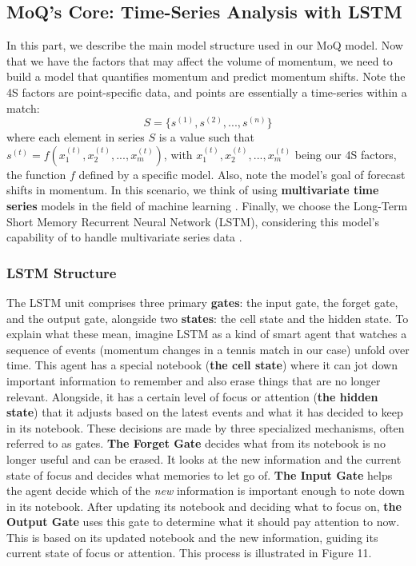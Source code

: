 \documentclass[12pt]{article}  %
\begin{document}
\subsection{MoQ's Core: Time-Series Analysis with LSTM}
In this part, we describe the main model structure used in our MoQ model. Now that we have the factors that may affect the volume of momentum, we need to build a model that quantifies momentum and predict momentum shifts. Note the 4S factors are point-specific data, and points are essentially a time-series within a match:
\[ 
	S = \{s^{(1)}, s^{(2)}, ..., s^{(n)}\}
\]
where each element in series $S$ is a value such that $s^{(t)}={f(x_1^{(t)}, x_2^{(t)}, ..., x_m^{(t)})}$, with $x_1^{(t)}, x_2^{(t)}, ..., x_m^{(t)}$ being our 4S factors, the function $f$ defined by a specific model. Also, note the model's goal of forecast shifts in momentum. In this scenario, we think of using \textbf{multivariate time series} models in the field of machine learning \cite{10}. Finally, we choose the Long-Term Short Memory Recurrent Neural Network (LSTM), considering this model's capability of to handle multivariate series data \cite{11}.
\subsubsection{LSTM Structure}

The LSTM unit comprises three primary \textbf{gates}: the input gate, the forget gate, and the output gate, alongside two \textbf{states}: the cell state and the hidden state. To explain what these mean, imagine LSTM as a kind of smart agent that watches a sequence of events (momentum changes in a tennis match in our case) unfold over time. This agent has a special notebook (\textbf{the cell state}) where it can jot down important information to remember and also erase things that are no longer relevant. Alongside, it has a certain level of focus or attention (\textbf{the hidden state}) that it adjusts based on the latest events and what it has decided to keep in its notebook. These decisions are made by three specialized mechanisms, often referred to as gates. \textbf{The Forget Gate} decides what from its notebook is no longer useful and can be erased. It looks at the new information and the current state of focus and decides what memories to let go of. \textbf{The Input Gate} helps the agent decide which of the \textit{new} information is important enough to note down in its notebook. After updating its notebook and deciding what to focus on, \textbf{the Output Gate} uses this gate to determine what it should pay attention to now. This is based on its updated notebook and the new information, guiding its current state of focus or attention. This process is illustrated in Figure 11.
\end{document}
